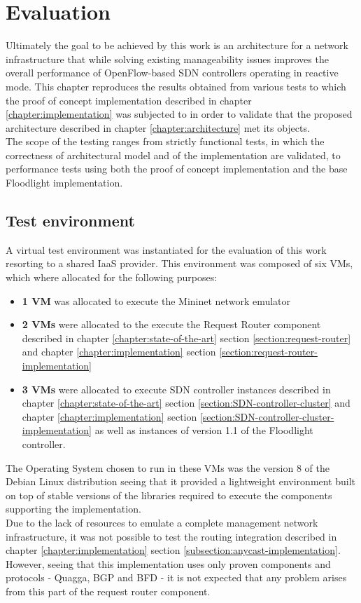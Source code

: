 
\chapter{Evaluation}
\label{chapter:evaluation}
Ultimately the goal to be achieved by this work is an architecture for a network infrastructure that while solving existing manageability issues improves the overall performance of OpenFlow-based \gls{SDN} controllers operating in reactive mode.
This chapter reproduces the results obtained from various tests to which the proof of concept implementation described in chapter \ref{chapter:implementation} was subjected to in order to validate that the proposed architecture described in chapter \ref{chapter:architecture} met its objects.\\
The scope of the testing ranges from strictly functional tests, in which the correctness of architectural model and of the implementation are validated, to performance tests using both the proof of concept implementation and the base Floodlight implementation.
%
\section{Test environment}
\label{section:test-environment}
A virtual test environment was instantiated for the evaluation of this work resorting to a shared \gls{IaaS} provider.
This environment was composed of six \glspl{VM}, which where allocated for the following purposes:
\begin{itemize}
	\item \textbf{1 \gls{VM}} was allocated to execute the Mininet network emulator
	\item \textbf{2 \glspl{VM}} were allocated to the execute the Request Router component described in chapter \ref*{chapter:state-of-the-art} section \ref{section:request-router} and chapter \ref*{chapter:implementation} section \ref{section:request-router-implementation}
	\item \textbf{3 \glspl{VM}} were allocated to execute \gls{SDN} controller instances described in chapter \ref*{chapter:state-of-the-art} section \ref{section:SDN-controller-cluster} and chapter \ref*{chapter:implementation} section \ref{section:SDN-controller-cluster-implementation} as well as instances of version 1.1 of the Floodlight controller.
\end{itemize}
%
The Operating System chosen to run in these \glspl{VM} was the version 8 of the Debian Linux distribution seeing that it provided a lightweight environment built on top of stable versions of the libraries required to execute the components supporting the implementation.\\
Due to the lack of resources to emulate a complete management network infrastructure, it was not possible to test the routing integration described in chapter \ref*{chapter:implementation} section \ref{subsection:anycast-implementation}.
However, seeing that this implementation uses only proven components and protocols - Quagga, \gls{BGP} and \gls{BFD} - it is not expected that any problem arises from this part of the request router component.
%
